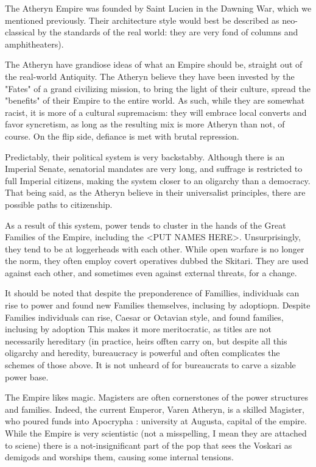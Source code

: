 The Atheryn Empire was founded by Saint Lucien in the Dawning War, which we mentioned previously. Their architecture style would best be described as neo-classical by the standards of the real world: they are very fond of columns and amphitheaters).

The Atheryn have grandiose ideas of what an Empire should be, straight out of the real-world Antiquity. The Atheryn believe they have been invested by the "Fates" of a grand civilizing mission, to bring the light of their culture, spread the "benefits" of their Empire to the entire world. As such, while they are somewhat racist, it is more of a cultural supremacism: they will embrace local converts and favor syncretism, as long as the resulting mix is more Atheryn than not, of course. On the flip side, defiance is met with brutal repression. 

Predictably, their political system is very backstabby. Although there is an Imperial Senate, senatorial mandates are very long, and suffrage is restricted to full Imperial citizens, making the system closer to an oligarchy than a democracy. That being said, as the Atheryn believe in their universalist principles, there are possible paths to citizenship.

As a result of this system, power tends to cluster in the hands of the Great Families of the Empire, including the <PUT NAMES HERE>. Unsurprisingly, they tend to be at loggerheads with each other. While open warfare is no longer the norm, they often employ covert operatives dubbed the Skitari. They are used against each other, and sometimes even against external threats, for a change.

It should be noted that despite the preponderence of Famillies, individuals can rise to power and found new Families themselves, inclusing by adoptiopn.
Despite Families individuals can rise, Caesar or Octavian style, and found families, inclusing by adoption
This makes it more meritocratic, as titles are not necessarily hereditary (in practice, heirs offten carry on, but despite all this oligarchy and heredity,  bureaucracy is powerful and often complicates the schemes of those above. It is not unheard of for bureaucrats to carve a sizable power base.

The Empire likes magic. Magisters are often cornerstones of the power structures and families. Indeed, the current Emperor, Varen Atheryn, is a skilled Magister, who poured funds into Apocrypha : university at Augusta, capital of the empire. While the Empire is very scientistic (not a misspelling, I mean they are attached to sciene) there is a not-insignificant part of the pop that sees the Voskari as demigods and worships them, causing some internal tensions. 


